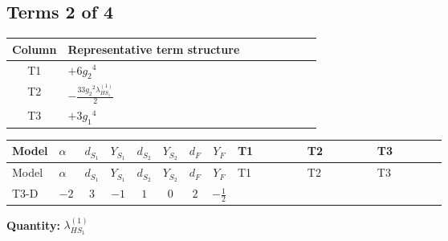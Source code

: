 \documentclass[8pt]{article}
\begin{document}
\begin{landscape}
\subsection*{Terms 2 of 4}
\begin{center}
\begin{tabular}{@{}c >{\raggedright\arraybackslash}p{0.82\linewidth}@{}}
\toprule
Column & Representative term structure \\
\midrule
T1 & \(\displaystyle +6 {g_2}^4\) \\
\midrule
T2 & \(\displaystyle -\frac{33 {g_2}^2 {\lambda_{HS_1}^{(1)}}}{2}\) \\
\midrule
T3 & \(\displaystyle +3 {g_1}^4\) \\
\midrule
\bottomrule
\end{tabular}
\end{center}
\smallskip
\tiny
\begin{longtable}{@{}llcccccc >{\raggedright\arraybackslash}p{0.21\linewidth} >{\raggedright\arraybackslash}p{0.21\linewidth} >{\raggedright\arraybackslash}p{0.21\linewidth}@{}}
\toprule
Model & $\alpha$ & $d_{S_1}$ & $Y_{S_1}$ & $d_{S_2}$ & $Y_{S_2}$ & $d_F$ & $Y_F$ & T1 & T2 & T3 \\
\midrule
\endfirsthead
\toprule
Model & $\alpha$ & $d_{S_1}$ & $Y_{S_1}$ & $d_{S_2}$ & $Y_{S_2}$ & $d_F$ & $Y_F$ & T1 & T2 & T3 \\
\midrule
\endhead
T3-D & $-2$ & $3$ & $-1$ & $1$ & $0$ & $2$ & $-\frac{1}{2}$ & \scriptsize\adjustbox{max width=\linewidth}{$\begin{gathered} +6 {g_2}^4\end{gathered}$} & \scriptsize\adjustbox{max width=\linewidth}{$\begin{gathered} -\frac{33 {g_2}^2 {\lambda_{HS_1}^{(1)}}}{2}\end{gathered}$} & \scriptsize\adjustbox{max width=\linewidth}{$\begin{gathered} +3 {g_1}^4\end{gathered}$} \\
\midrule
\bottomrule
\end{longtable}
\clearpage
\noindent\textbf{Quantity: }$\lambda_{HS_1}^{(1)}$\par\smallskip

\end{landscape}
\end{document}
